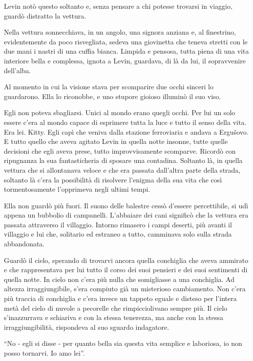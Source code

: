 Levin notò questo soltanto e, senza pensare a chi potesse trovarsi in viaggio, guardò distratto la vettura. 

Nella vettura sonnecchiava, in un angolo, una signora anziana e, al finestrino, evidentemente da poco risvegliata, sedeva una giovinetta che teneva stretti con le due mani i nastri di una cuffia bianca. Limpida e pensosa, tutta piena di una vita interiore bella e complessa, ignota a Levin, guardava, di là da lui, il sopravvenire dell'alba. 

Al momento in cui la visione stava per scomparire due occhi sinceri lo guardarono. Ella lo riconobbe, e uno stupore gioioso illuminò il suo viso. 

Egli non poteva sbagliarsi. Unici al mondo erano quegli occhi. Per lui un solo essere c'era al mondo capace di esprimere tutta la luce e tutto il senso della vita. Era lei. Kitty. Egli capì che veniva dalla stazione ferroviaria e andava a Ergušovo. E tutto quello che aveva agitato Levin in quella notte insonne, tutte quelle decisioni che egli aveva prese, tutto improvvisamente scomparve. Ricordò con ripugnanza la sua fantasticheria di sposare una contadina. Soltanto là, in quella vettura che si allontanava veloce e che era passata dall'altra parte della strada, soltanto là c'era la possibilità di risolvere l'enigma della sua vita che così tormentosamente l'opprimeva negli ultimi tempi. 

Ella non guardò più fuori. Il suono delle balestre cessò d'essere percettibile, si udì appena un bubbolio di campanelli. L'abbaiare dei cani significò che la vettura era passata attraverso il villaggio. Intorno rimasero i campi deserti, più avanti il villaggio e lui che, solitario ed estraneo a tutto, camminava solo sulla strada abbandonata. 

Guardò il cielo, sperando di trovarvi ancora quella conchiglia che aveva ammirato e che rappresentava per lui tutto il corso dei suoi pensieri e dei suoi sentimenti di quella notte. In cielo non c'era più nulla che somigliasse a una conchiglia. Ad altezza irraggiungibile, s'era compiuto già un misterioso cambiamento. Non c'era più traccia di conchiglia e c'era invece un tappeto eguale e disteso per l'intera metà del cielo di nuvole a pecorelle che rimpicciolivano sempre più. Il cielo s'inazzurrava e schiariva e con la stessa tenerezza, ma anche con la stessa irraggiungibilità, rispondeva al suo sguardo indagatore. 

``No - egli si disse - per quanto bella sia questa vita semplice e laboriosa, io non posso tornarvi. Io amo lei''. 

